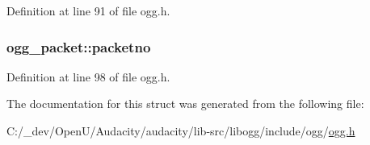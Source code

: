 Definition at line 91 of file ogg.\+h.

\subsubsection[{\texorpdfstring{packetno}{packetno}}]{ ogg\+\_\+packet\+::packetno}\hypertarget{structogg__packet_a60e257b3a8f843135474457197c65a45}{}\label{structogg__packet_a60e257b3a8f843135474457197c65a45}


Definition at line 98 of file ogg.\+h.



The documentation for this struct was generated from the following file\+:\begin{DoxyCompactItemize}
\item 
C\+:/\+\_\+dev/\+Open\+U/\+Audacity/audacity/lib-\/src/libogg/include/ogg/\hyperlink{ogg_8h}{ogg.\+h}\end{DoxyCompactItemize}
